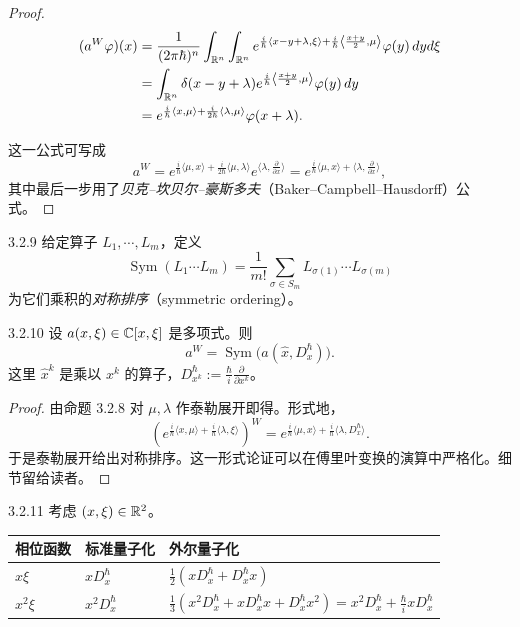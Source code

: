 \begin{proof}
\begin{align*}
(a^W\varphi)(x)
&=\frac{1}{(2\pi\hbar)^n}\int_{\mathbb{R}^n}\int_{\mathbb{R}^n}e^{\frac i\hbar\langle x-y+\lambda,\xi\rangle+\frac i\hbar\left\langle\frac{x+y}{2},\mu\right\rangle}\varphi(y)\,dyd\xi\\
&=\int_{\mathbb{R}^n}\delta(x-y+\lambda)e^{\frac i\hbar\left\langle\frac{x+y}{2},\mu\right\rangle}\varphi(y)\,dy\\
&=e^{\frac i\hbar\langle x,\mu\rangle+\frac{i}{2\hbar}\langle\lambda,\mu\rangle}\varphi(x+\lambda).
\end{align*}


这一公式可写成
\[
a^W=e^{\frac i\hbar\langle\mu,x\rangle+\frac{i}{2\hbar}\langle\mu,\lambda\rangle}e^{\langle\lambda,\frac{\partial}{\partial x}\rangle}
=e^{\frac i\hbar\langle\mu,x\rangle+\langle\lambda,\frac{\partial}{\partial x}\rangle},
\]
其中最后一步用了\emph{贝克–坎贝尔–豪斯多夫}（Baker–Campbell–Hausdorff）公式。
\end{proof}

\begin{definition}{3.2.9}
给定算子 $L_1,\cdots,L_m$，定义
\[
\operatorname{Sym}(L_1\cdots L_m)=\frac{1}{m!}\sum_{\sigma\in S_m}L_{\sigma(1)}\cdots L_{\sigma(m)}
\]
为它们乘积的\emph{对称排序}（symmetric ordering）。
\end{definition}

\begin{proposition}{3.2.10}
设 $a(x,\xi)\in\mathbb{C}[x,\xi]$ 是多项式。则
\[
a^W=\operatorname{Sym}\bigl(a(\hat{x},D_{x}^\hbar)\bigr).
\]
这里 $\hat x^k$ 是乘以 $x^k$ 的算子，$D^\hbar_{x^k}:=\frac{\hbar}{i}\frac{\partial}{\partial x^k}$。
\end{proposition}

\begin{proof}
由命题 3.2.8 对 $\mu,\lambda$ 作泰勒展开即得。形式地，
\[
\left(e^{\frac i\hbar\langle x,\mu\rangle+\frac i\hbar\langle\lambda,\xi\rangle}\right)^{W}
=e^{\frac i\hbar\langle\mu,x\rangle+\frac i\hbar\langle\lambda,D_{x}^\hbar\rangle}.
\]
于是泰勒展开给出对称排序。这一形式论证可以在傅里叶变换的演算中严格化。细节留给读者。
\end{proof}

\begin{example}{3.2.11}
考虑 $(x,\xi)\in\mathbb{R}^2$。
\begin{center}
\begin{tabular}{lll}
\toprule
相位函数 & 标准量子化 & 外尔量子化\\
\midrule
$x\xi$ & $xD^\hbar_x$ & $\frac12\left(xD^\hbar_x+D^\hbar_xx\right)$\\
$x^2\xi$ & $x^2D^\hbar_x$ & $\frac13\left(x^2D^\hbar_x+xD^\hbar_xx+D^\hbar_xx^2\right)=x^2D^\hbar_x+\frac{\hbar}{i}xD^\hbar_x$\\
\bottomrule
\end{tabular}
\end{center}
\end{example}

